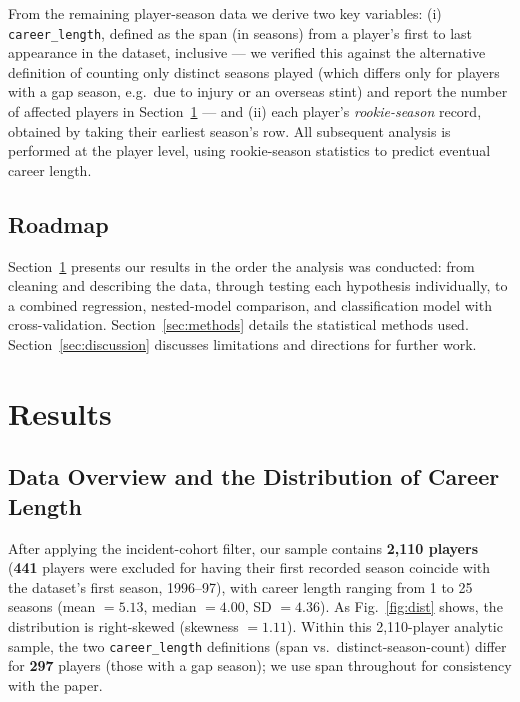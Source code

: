 \documentclass[10pt,twocolumn]{article}
\begin{document}
From the remaining player-season data we derive two key variables: (i)
\texttt{career\_length}, defined as the span (in seasons) from a
player's first to last appearance in the dataset, inclusive --- we
verified this against the alternative definition of counting only
distinct seasons played (which differs only for players with a gap
season, e.g.\ due to injury or an overseas stint) and report the
number of affected players in Section~\ref{sec:results} --- and (ii)
each player's \textit{rookie-season} record, obtained by taking their
earliest season's row. All subsequent analysis is performed at the
player level, using rookie-season statistics to predict eventual
career length.

\subsection{Roadmap}
Section~\ref{sec:results} presents our results in the order the analysis
was conducted: from cleaning and describing the data, through testing
each hypothesis individually, to a combined regression, nested-model
comparison, and classification model with cross-validation.
Section~\ref{sec:methods} details the statistical methods used.
Section~\ref{sec:discussion} discusses limitations and directions for
further work.

\section{Results}
\label{sec:results}

\subsection{Data Overview and the Distribution of Career Length}
After applying the incident-cohort filter, our sample contains
\textbf{2{,}110 players} (\textbf{441} players were excluded for
having their first recorded season coincide with the dataset's first
season, 1996--97), with career length ranging from 1 to 25 seasons
(mean $=5.13$, median $=4.00$, SD $=4.36$). As Fig.~\ref{fig:dist}
shows, the distribution is right-skewed (skewness $=1.11$). Within
this 2{,}110-player analytic sample, the two \texttt{career\_length}
definitions (span vs.\ distinct-season-count) differ for
\textbf{297} players (those with a gap season);
we use span throughout for consistency with the paper.
\end{document}
